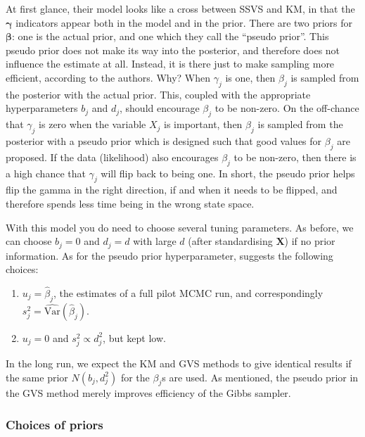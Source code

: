 At first glance, their model looks like a cross between SSVS and KM, in that the $\boldsymbol\gamma$ indicators appear both in the model and in the prior. There are two priors for $\boldsymbol\beta$: one is the actual prior, and one which they call the ``pseudo prior''. This pseudo prior does not make its way into the posterior, and therefore does not influence the estimate at all. Instead, it is there just to make sampling more efficient, according to the authors. Why? When $\gamma_j$ is one, then $\beta_j$ is sampled from the posterior with the actual prior. This, coupled with the appropriate hyperparameters $b_j$ and $d_j$, should encourage $\beta_j$ to be non-zero. On the off-chance that $\gamma_j$ is zero when the variable $X_j$ is important, then $\beta_j$ is sampled from the posterior with a pseudo prior which is designed such that good values for $\beta_j$ are proposed. If the data (likelihood) also encourages $\beta_j$ to be non-zero, then there is a high chance that $\gamma_j$ will flip back to being one. In short, the pseudo prior helps flip the gamma in the right direction, if and when it needs to be flipped, and therefore spends less time being in the wrong state space. 

With this model you do need to choose several tuning parameters. As before, we can choose $b_j = 0$ and $d_j=d$ with large $d$ (after standardising $\mathbf X$) if no prior information. As for the pseudo prior hyperparameter, \cite{Dellaportas2002} suggests the following choices:
\begin{enumerate}
	\vspace{-3mm}
	\item $u_j=\hat\beta_j$, the estimates of a full pilot MCMC run, and correspondingly $s^2_j = \widehat{\text{Var}}(\hat\beta_j)$.
	\item $u_j=0$ and $s^2_j \propto d_j^2$, but kept low.
	\vspace{1mm}
\end{enumerate}

\begin{remark}
	In the long run, we expect the KM and GVS methods to give identical results if the same prior $N(b_j, d_j^2)$ for the $\beta_j$s are used. As mentioned, the pseudo prior in the GVS method merely improves efficiency of the Gibbs sampler.
\end{remark}

\subsubsection{Choices of priors}
\label{sec:priorchoices}

